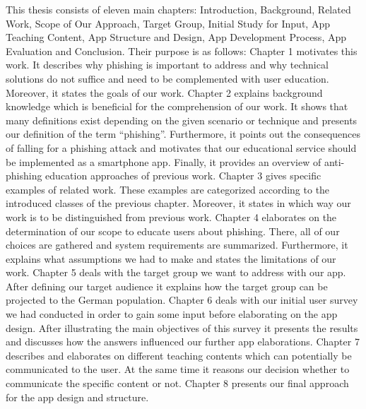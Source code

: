 This thesis consists of eleven main chapters: Introduction, Background, Related Work, Scope of Our Approach, Target Group, Initial Study for Input, App Teaching Content, App Structure and Design, App Development Process, App Evaluation and Conclusion. Their purpose is as follows:
\newline
Chapter 1 motivates this work. It describes why phishing is important to address and why technical solutions do not suffice and need to be complemented with user education. Moreover, it states the goals of our work.
\newline
Chapter 2 explains background knowledge which is beneficial for the comprehension of our work. 
It shows that many definitions exist depending on the given scenario or technique and presents our definition of the term ``phishing''. Furthermore, it points out the consequences of falling for a phishing attack and motivates that our educational service should be implemented as a smartphone app.
Finally, it provides an overview of anti-phishing education approaches of previous work.
\newline
Chapter 3 gives specific examples of related work. These examples are categorized according to the introduced classes of the previous chapter. Moreover, it states in which way our work is to be distinguished from previous work. 
\newline
Chapter 4 elaborates on the determination of our scope to educate users about phishing. 
There, all of our choices are gathered and system requirements are summarized.
Furthermore, it explains what assumptions we had to make and states the limitations of our work.
\newline
Chapter 5 deals with the target group we want to address with our app.
After defining our target audience it explains how the target group can be projected to the German population.
\newline
Chapter 6 deals with our initial user survey we had conducted in order to gain some input before elaborating on the app design. After illustrating the main objectives of this survey it presents the results and discusses how the answers influenced our further app elaborations.
\newline
Chapter 7 describes and elaborates on different teaching contents which can potentially be communicated to the user. At the same time it reasons our decision whether to communicate the specific content or not.
\newline
Chapter 8 presents our final approach for the app design and structure.
